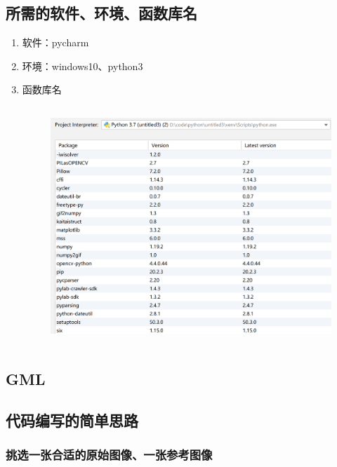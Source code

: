 \documentclass{article}
\begin{document}
\subsection{所需的软件、环境、函数库名}

\begin{enumerate}
    \item 软件：pycharm
    \item 环境：windows10、python3
    \item 函数库名
    \begin{figure}[h!]
                \centering
                \includegraphics[width=14cm,height=9cm]{python.png}
    \end{figure}
\end{enumerate}
\subsection{GML}
\subsection{代码编写的简单思路}
\subsubsection{挑选一张合适的原始图像、一张参考图像}
\end{document}
